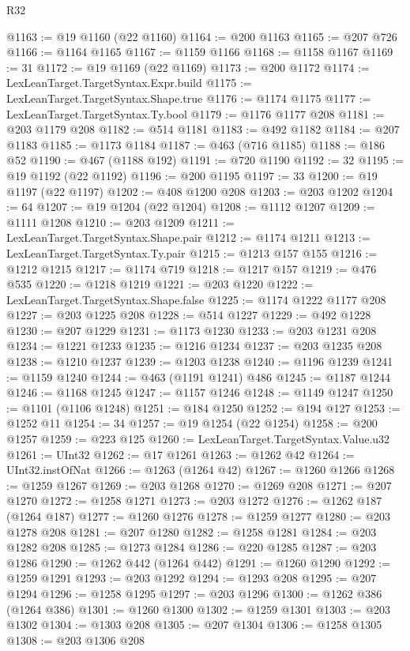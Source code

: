 \begin{lexlean}{R32}
\begin{coremodule}
@1163 := @19 @1160 (@22 @1160)
@1164 := @200 @1163
@1165 := @207 @726
@1166 := @1164 @1165
@1167 := @1159 @1166
@1168 := @1158 @1167
@1169 := 31
@1172 := @19 @1169 (@22 @1169)
@1173 := @200 @1172
@1174 := LexLeanTarget.TargetSyntax.Expr.build
@1175 := LexLeanTarget.TargetSyntax.Shape.true
@1176 := @1174 @1175
@1177 := LexLeanTarget.TargetSyntax.Ty.bool
@1179 := @1176 @1177 @208
@1181 := @203 @1179 @208
@1182 := @514 @1181
@1183 := @492 @1182
@1184 := @207 @1183
@1185 := @1173 @1184
@1187 := @463 (@716 @1185)
@1188 := @186 @52
@1190 := @467 (@1188 @192)
@1191 := @720 @1190
@1192 := 32
@1195 := @19 @1192 (@22 @1192)
@1196 := @200 @1195
@1197 := 33
@1200 := @19 @1197 (@22 @1197)
@1202 := @408 @1200 @208
@1203 := @203 @1202
@1204 := 64
@1207 := @19 @1204 (@22 @1204)
@1208 := @1112 @1207
@1209 := @1111 @1208
@1210 := @203 @1209
@1211 := LexLeanTarget.TargetSyntax.Shape.pair
@1212 := @1174 @1211
@1213 := LexLeanTarget.TargetSyntax.Ty.pair
@1215 := @1213 @157 @155
@1216 := @1212 @1215
@1217 := @1174 @719
@1218 := @1217 @157
@1219 := @476 @535
@1220 := @1218 @1219
@1221 := @203 @1220
@1222 := LexLeanTarget.TargetSyntax.Shape.false
@1225 := @1174 @1222 @1177 @208
@1227 := @203 @1225 @208
@1228 := @514 @1227
@1229 := @492 @1228
@1230 := @207 @1229
@1231 := @1173 @1230
@1233 := @203 @1231 @208
@1234 := @1221 @1233
@1235 := @1216 @1234
@1237 := @203 @1235 @208
@1238 := @1210 @1237
@1239 := @1203 @1238
@1240 := @1196 @1239
@1241 := @1159 @1240
@1244 := @463 (@1191 @1241) @486
@1245 := @1187 @1244
@1246 := @1168 @1245
@1247 := @1157 @1246
@1248 := @1149 @1247
@1250 := @1101 (@1106 @1248)
@1251 := @184 @1250
@1252 := @194 @127
@1253 := @1252 @11
@1254 := 34
@1257 := @19 @1254 (@22 @1254)
@1258 := @200 @1257
@1259 := @223 @125
@1260 := LexLeanTarget.TargetSyntax.Value.u32
@1261 := UInt32
@1262 := @17 @1261
@1263 := @1262 @42
@1264 := UInt32.instOfNat
@1266 := @1263 (@1264 @42)
@1267 := @1260 @1266
@1268 := @1259 @1267
@1269 := @203 @1268
@1270 := @1269 @208
@1271 := @207 @1270
@1272 := @1258 @1271
@1273 := @203 @1272
@1276 := @1262 @187 (@1264 @187)
@1277 := @1260 @1276
@1278 := @1259 @1277
@1280 := @203 @1278 @208
@1281 := @207 @1280
@1282 := @1258 @1281
@1284 := @203 @1282 @208
@1285 := @1273 @1284
@1286 := @220 @1285
@1287 := @203 @1286
@1290 := @1262 @442 (@1264 @442)
@1291 := @1260 @1290
@1292 := @1259 @1291
@1293 := @203 @1292
@1294 := @1293 @208
@1295 := @207 @1294
@1296 := @1258 @1295
@1297 := @203 @1296
@1300 := @1262 @386 (@1264 @386)
@1301 := @1260 @1300
@1302 := @1259 @1301
@1303 := @203 @1302
@1304 := @1303 @208
@1305 := @207 @1304
@1306 := @1258 @1305
@1308 := @203 @1306 @208

\end{coremodule}
\end{lexlean}
